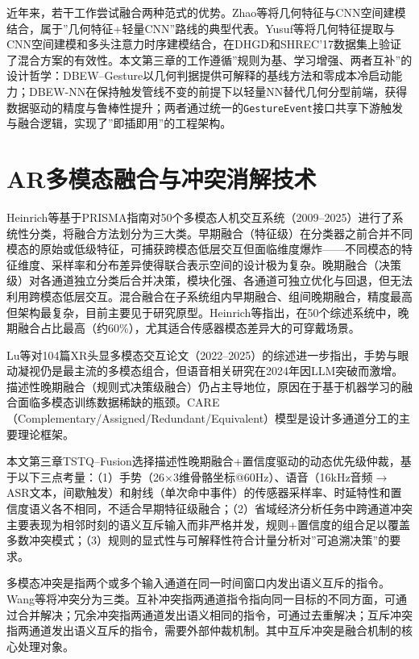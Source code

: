 近年来，若干工作尝试融合两种范式的优势。Zhao等\cite{zhao2022fast_skeleton_hgr}将几何特征与CNN空间建模结合，属于”几何特征+轻量CNN”路线的典型代表。Yusuf等\cite{geometric_spatiotemporal_hgr2023}将几何特征提取与CNN空间建模和多头注意力时序建模结合，在DHGD和SHREC'17数据集上验证了混合方案的有效性。本文第三章的工作遵循”规则为基、学习增强、两者互补”的设计哲学：DBEW--Gesture以几何判据提供可解释的基线方法和零成本冷启动能力；DBEW-NN在保持触发管线不变的前提下以轻量NN替代几何分型前端，获得数据驱动的精度与鲁棒性提升；两者通过统一的\texttt{GestureEvent}接口共享下游触发与融合逻辑，实现了”即插即用”的工程架构。

\section{AR多模态融合与冲突消解技术}
\label{sec:ch2_fusion_survey}

Heinrich等\cite{heinrich2025fusion_survey}基于PRISMA指南对50个多模态人机交互系统（2009--2025）进行了系统性分类，将融合方法划分为三大类。早期融合（特征级）在分类器之前合并不同模态的原始或低级特征，可捕获跨模态低层交互但面临维度爆炸——不同模态的特征维度、采样率和分布差异使得联合表示空间的设计极为复杂。晚期融合（决策级）对各通道独立分类后合并决策，模块化强、各通道可独立优化与回退，但无法利用跨模态低层交互。混合融合在子系统组内早期融合、组间晚期融合，精度最高但架构最复杂，目前主要见于研究原型。Heinrich等指出，在50个综述系统中，晚期融合占比最高（约60\%），尤其适合传感器模态差异大的可穿戴场景。

Lu等\cite{lu2025spatial_computing}对104篇XR头显多模态交互论文（2022--2025）的综述进一步指出，手势与眼动凝视仍是最主流的多模态组合，但语音相关研究在2024年因LLM突破而激增。描述性晚期融合（规则式决策级融合）仍占主导地位，原因在于基于机器学习的融合面临多模态训练数据稀缺的瓶颈。CARE（Complementary/Assigned/Redundant/Equivalent）模型是设计多通道分工的主要理论框架。

本文第三章TSTQ--Fusion选择描述性晚期融合+置信度驱动的动态优先级仲裁，基于以下三点考量：（1）手势（26$\times$3维骨骼坐标@60Hz）、语音（16kHz音频$\rightarrow$ASR文本，间歇触发）和射线（单次命中事件）的传感器采样率、时延特性和置信度语义各不相同，不适合早期特征级融合；（2）省域经济分析任务中跨通道冲突主要表现为相邻时刻的语义互斥输入而非严格并发，规则+置信度的组合足以覆盖多数冲突模式；（3）规则的显式性与可解释性符合计量分析对”可追溯决策”的要求。

多模态冲突是指两个或多个输入通道在同一时间窗口内发出语义互斥的指令。Wang等\cite{wang2026ar_io_survey}将冲突分为三类。互补冲突指两通道指令指向同一目标的不同方面，可通过合并解决；冗余冲突指两通道发出语义相同的指令，可通过去重解决；互斥冲突指两通道发出语义互斥的指令，需要外部仲裁机制。其中互斥冲突是融合机制的核心处理对象。

